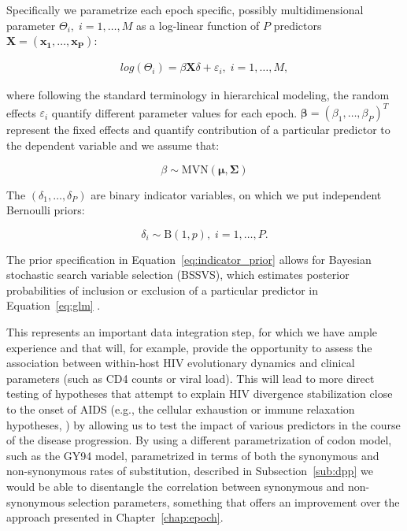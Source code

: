 Specifically we parametrize each epoch specific, possibly multidimensional parameter $\Theta_{i},\; i=1,\ldots,M$ as a log-linear function of $P$ predictors $\mathbf{X}=\left(\mathbf{x_1},\ldots,\mathbf{x_P} \right)$:

\begin{align}
log\left(\Theta_{i}\right)=\beta \mathbf{X} \delta+\varepsilon_{i},\; i=1,\ldots,M,
\label{eq:mixed_model}
\end{align}

\noindent
where following the standard terminology in hierarchical modeling, the random effects $\varepsilon_{i}$ quantify different parameter values for each epoch.
$\mathbf{\beta}=\left(\beta_1,\ldots,\beta_P \right)^T$ represent the fixed effects and quantify contribution of a particular predictor to the dependent variable and we assume that:  

\begin{equation}
\beta \sim \text{MVN}(\boldsymbol{\mu},\boldsymbol{\Sigma})
\label{eq:beta_proposal}
\end{equation}

\noindent
The $\left(\delta_1,\ldots,\delta_P \right)$ are binary indicator variables, on which we put independent Bernoulli priors:

\begin{equation}
\delta_{i} \sim \text{B}\left(1,p\right),\;i=1,\ldots,P.
\label{eq:indicator_prior}
\end{equation}

\noindent
The prior specification in Equation~\ref{eq:indicator_prior} allows for Bayesian stochastic search variable selection (BSSVS), which estimates posterior probabilities of inclusion or exclusion of a particular predictor in Equation~\ref{eq:glm} \cite{Lemey2009}.

This represents an important data integration step, for which we have ample experience \citep{Edo-Matas2011,Streicker2012,Vrancken2014} and that will, for example, provide the opportunity to assess the association between within-host HIV evolutionary dynamics and clinical parameters (such as CD4 counts or viral load). 
This will lead to more direct testing of hypotheses that attempt to explain HIV divergence stabilization close to the onset of AIDS (e.g., the cellular exhaustion or immune relaxation hypotheses, \citep{Lemey2007}) by allowing us to test the impact of various predictors in the course of the disease progression.
By using a different parametrization of codon model, such as the GY94 model, parametrized in terms of both the synonymous and non-synonymous rates of substitution, described in Subsection~\ref{sub:dpp} we would be able to disentangle the correlation between synonymous and non-synonymous selection parameters, something that offers an improvement over the approach presented in Chapter~\ref{chap:epoch}.




